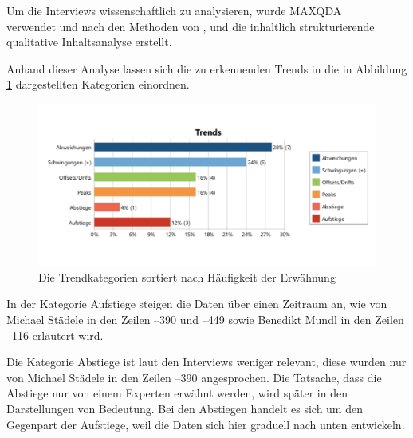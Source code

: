 Um die Interviews wissenschaftlich zu analysieren, wurde MAXQDA\\ \cite{MAXQDA.2023} verwendet und nach den Methoden von \cite{Mayring.2022}, \cite{Kuckartz.2022} und \cite{AndreMorgensternEinenkel.2023} die inhaltlich strukturierende qualitative Inhaltsanalyse erstellt.


Anhand dieser Analyse lassen sich die zu erkennenden Trends in die in Abbildung \ref{fig:trends} dargestellten Kategorien einordnen.

\begin{figure}[h!]
    \centering
    \includegraphics[scale=0.7]{appendix/InterviewTrends/anzahl trends.pdf}
    \caption{Die Trendkategorien sortiert nach Häufigkeit der Erwähnung}
    \label{fig:trends}
\end{figure}

In der Kategorie Aufstiege steigen die Daten über einen Zeitraum an, wie von Michael Städele in den Zeilen --390 und --449 sowie Benedikt Mundl in den Zeilen --116 erläutert wird.

Die Kategorie Abstiege ist laut den Interviews weniger relevant, diese wurden nur von Michael Städele in den Zeilen --390 angesprochen. Die Tatsache, dass die Abstiege nur von einem Experten erwähnt werden, wird später in den Darstellungen von Bedeutung. Bei den Abstiegen handelt es sich um den Gegenpart der Aufstiege, weil die Daten sich hier graduell nach unten entwickeln.

